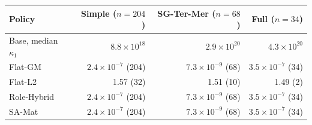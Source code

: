 \begin{tabular}{lrrr}
\toprule
Policy & Simple ($n=204$) & SG-Ter-Mer ($n=68$) & Full ($n=34$) \\
\midrule
Base, median $\kappa_1$ & $8.8\times10^{18}$ & $2.9\times10^{20}$ & $4.3\times10^{20}$ \\
\addlinespace
Flat-GM & $2.4\times10^{-7}$ (204) & $7.3\times10^{-9}$ (68) & $3.5\times10^{-7}$ (34) \\
Flat-L2 & 1.57 (32) & 1.51 (10) & 1.49 (2) \\
Role-Hybrid & $2.4\times10^{-7}$ (204) & $7.3\times10^{-9}$ (68) & $3.5\times10^{-7}$ (34) \\
SA-Mat & $2.4\times10^{-7}$ (204) & $7.3\times10^{-9}$ (68) & $3.5\times10^{-7}$ (34) \\
\bottomrule
\end{tabular}
